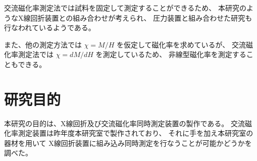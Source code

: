 交流磁化率測定法では試料を固定して測定することができるため、
本研究のようなX線回折装置との組み合わせが考えられ、
圧力装置と組み合わせた研究も行なわれているようである。

また、他の測定方法では $\chi=M/H$ を仮定して磁化率を求めているが、
交流磁化率測定法では $\chi=dM/dH$ を測定しているため、
非線型磁化率を測定することもできる。

\section{研究目的}\label{sec:mokuteki}
本研究の目的は、X線回折及び交流磁化率同時測定装置の製作である。
交流磁化率測定装置は昨年度本研究室で製作されており、
それに手を加え本研究室の器材を用いて
X線回折装置に組み込み同時測定を行なうことが可能かどうかを調べた。